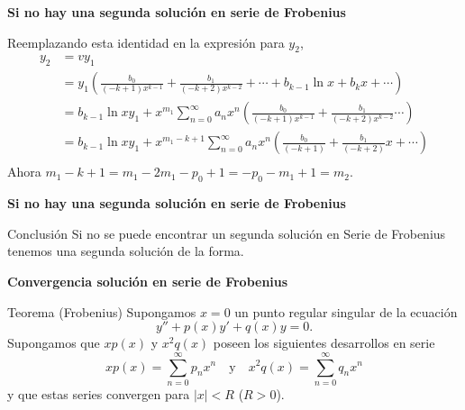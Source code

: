 \begin{frame}[fragile]{\textbf{Si no hay una segunda solución en serie de Frobenius}}

Reemplazando esta identidad en la expresión para $y_2$,
\[
   \begin{split}
     y_2&=vy_1\\
&=y_1\left(\frac{b_0}{(-k+1)x^{k-1}}+ \frac{b_1}{(-k+2)x^{k-2}}+\cdots+b_{k-1}\ln x+b_{k}x+\cdots\right)\\
       &=b_{k-1}\ln x y_1+ x^{m_1}\sum_{n=0}^{\infty}a_nx^n\left(\frac{b_0}{(-k+1)x^{k-1}}+ \frac{b_1}{(-k+2)x^{k-2}}\cdots\right)\\
       &=b_{k-1}\ln x y_1+ x^{m_1-k+1}\sum_{n=0}^{\infty}a_nx^n\left(\frac{b_0}{(-k+1)}+ \frac{b_1}{(-k+2)}x+\cdots\right)\\
   \end{split}
\]
Ahora $m_1-k+1=m_1-2m_1-p_0+1=-p_0-m_1+1=m_2$. 


\end{frame}






\begin{frame}[fragile]{\textbf{Si no hay una segunda solución en serie de Frobenius}}

\begin{block}{Conclusión}
 Si no se puede encontrar un segunda solución en Serie de Frobenius tenemos una segunda solución de la forma.
 
 
\end{block}







\end{frame}






\begin{frame}[fragile]{\textbf{Convergencia solución en serie de Frobenius}}

\begin{block}{Teorema (Frobenius)} 
Supongamos $x=0$ un punto regular singular de la ecuación
\begin{equation}\label{eq:dif_2_orden} y''+p(x)y'+q(x)y=0.
\end{equation}
Supongamos que $xp(x)$ y $x^2q(x)$ poseen los  siguientes desarrollos en serie
\[xp(x)=\sum_{n=0}^{\infty}p_nx^n\quad\text{y}\quad x^2q(x)=\sum_{n=0}^{\infty}q_nx^n\]
y que estas series convergen para $|x|<R$ ($R>0$). 
\end{block}

\end{frame}

